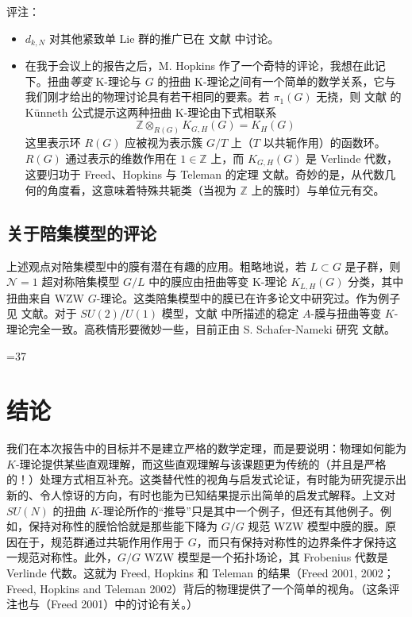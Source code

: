 \documentclass[11pt,a4paper]{ctexart}
\newcommand{\SrcRange}[2]{\ifnum#1=#2\marginpar{\raggedright\footnotesize 原文 p.#1}\else\marginpar{\raggedright\footnotesize 原文 pp.#1--#2}\fi}
\begin{document}
评注：

\begin{itemize}
\item
  \(d_{k,N}\) 对其他紧致单 Lie 群的推广已在 文献 中讨论。
\item
  在我于会议上的报告之后，M. Hopkins 作了一个奇特的评论，我想在此记下。扭曲\emph{等变} K-理论与 \(G\) 的扭曲 K-理论之间有一个简单的数学关系，它与我们刚才给出的物理讨论具有若干相同的要素。若 \(\pi_1(G)\) 无挠，则 文献 的 Künneth 公式提示这两种扭曲 K-理论由下式相联系 \[\mathbb{Z} \otimes_{R(G)} K_{G,H}(G) = K_H(G)\] 这里表示环 \(R(G)\) 应被视为表示簇 \(G/T\) 上（\(T\) 以共轭作用）的函数环。\(R(G)\) 通过表示的维数作用在 \(1\in \mathbb{Z}\) 上，而 \(K_{G,H}(G)\) 是 Verlinde 代数，这要归功于 Freed、Hopkins 与 Teleman 的定理 文献。奇妙的是，从代数几何的角度看，这意味着特殊共轭类（当视为 \(\mathbb{Z}\) 上的簇时）与单位元有交。
\end{itemize}

\subsection{关于陪集模型的评论}\label{ux5173ux4e8eux966aux96c6ux6a21ux578bux7684ux8bc4ux8bba}

上述观点对陪集模型中的膜有潜在有趣的应用。粗略地说，若 \(L\subset G\) 是子群，则 \({\mathcal N}=1\) 超对称陪集模型 \(G/L\) 中的膜应由扭曲等变 K-理论 \(K_{L,H}(G)\) 分类，其中扭曲来自 WZW \(G\)-理论。这类陪集模型中的膜已在许多论文中研究过。作为例子见 文献。对于 \(SU(2)/U(1)\) 模型，文献 中所描述的稳定 \(A\)-膜与扭曲等变 \(K\)-理论完全一致。高秩情形要微妙一些，目前正由 S. Schafer-Nameki 研究 文献。

\SrcRange{37}{37}
\section{结论}\label{ux7ed3ux8bba}

我们在本次报告中的目标并不是建立严格的数学定理，而是要说明：物理如何能为 \(K\)-理论提供某些直观理解，而这些直观理解与该课题更为传统的（并且是严格的！）处理方式相互补充。这类替代性的视角与启发式论证，有时能为研究提示出新的、令人惊讶的方向，有时也能为已知结果提示出简单的启发式解释。上文对 \(SU(N)\) 的扭曲 \(K\)-理论所作的``推导''只是其中一个例子，但还有其他例子。例如，保持对称性的膜恰恰就是那些能下降为 \(G/G\) 规范 WZW 模型中膜的膜。原因在于，规范群通过共轭作用作用于 \(G\)，而只有保持对称性的边界条件才保持这一规范对称性。此外，\(G/G\) WZW 模型是一个拓扑场论，其 Frobenius 代数是 Verlinde 代数。这就为 Freed, Hopkins 和 Teleman 的结果（Freed 2001, 2002；Freed, Hopkins and Teleman 2002）背后的物理提供了一个简单的视角。（这条评注也与（Freed 2001）中的讨论有关。）
\end{document}
